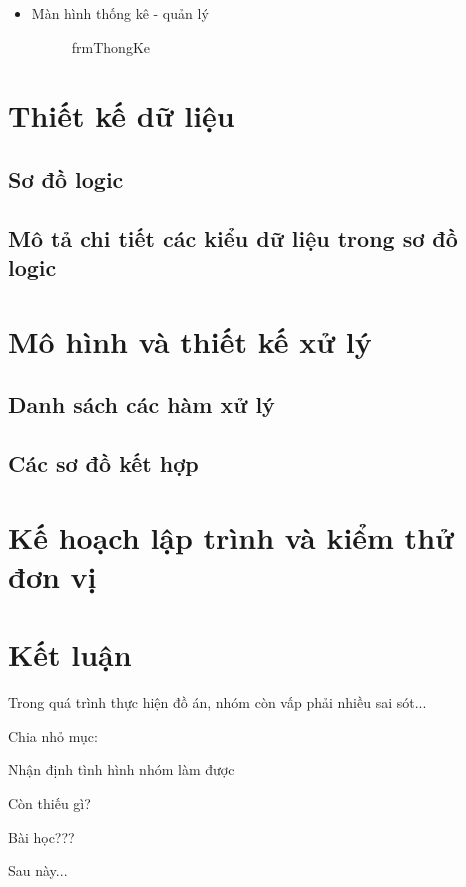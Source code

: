 \documentclass{article}
\begin{document}
\begin{enumerate}
\begin{itemize}
					\newpage
					\item Màn hình thống kê - quản lý
						\begin{figure}[!h]
							\setlength\fboxsep{1pt}
							\setlength\fboxrule{1pt}
							\caption{frmThongKe}
							\label{fig:frmThongKe}
						\end{figure}
				\end{itemize}
			
		\end{enumerate}
	
	
	\section{Thiết kế dữ liệu}
	\subsection{Sơ đồ logic}
	\subsection{Mô tả chi tiết các kiểu dữ liệu trong sơ đồ logic}
	
	\section{Mô hình và thiết kế xử lý}
	\subsection{Danh sách các hàm xử lý}
	\subsection{Các sơ đồ kết hợp}
	
	\section{Kế hoạch lập trình và kiểm thử đơn vị}
	
	\section{Kết luận}
	
	Trong quá trình thực hiện đồ án, nhóm còn vấp phải nhiều sai sót...
	
	
	Chia nhỏ mục:
	
	Nhận định tình hình nhóm làm được
	
	Còn thiếu gì?
	
	Bài học???
	
	Sau này...
	
\end{document}
